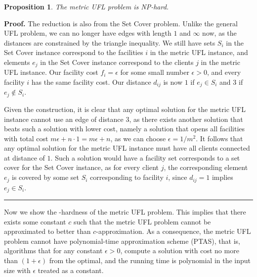 \documentclass[oneside,final]{ucr}
\newtheorem{proposition}[theorem]{Proposition}
\newenvironment{proof}[1][Proof]{\textbf{#1.} }{\ \rule{0.5em}{0.5em}}
\begin{document}
\begin{proposition} \label{prop:metricNP}
  The metric UFL problem is NP-hard.
\end{proposition}
\begin{proof}
  The reduction is also from the Set Cover problem. Unlike
  the general UFL problem, we can no longer have edges with
  length $1$ and $\infty$ now, as the distances are
  constrained by the triangle inequality. We still have sets
  $S_i$ in the Set Cover instance correspond to the
  facilities $i$ in the metric UFL instance, and elements
  $e_j$ in the Set Cover instance correspond to the clients
  $j$ in the metric UFL instance. Our facility cost $f_i =
  \epsilon$ for some small number $\epsilon > 0$, and every
  facility $i$ has the same facility cost. Our distance
  $d_{ij}$ is now $1$ if $e_j \in S_i$ and $3$ if $e_j
  \notin S_i$.

  Given the construction, it is clear that any optimal
  solution for the metric UFL instance cannot use an edge of
  distance $3$, as there exists another solution that beats
  such a solution with lower cost, namely a solution that
  opens all facilities with total cost $m\epsilon + n\cdot 1
  = m\epsilon + n$, as we can choose $\epsilon = 1/m^2$. It
  follows that any optimal solution for the metric UFL
  instance must have all clients connected at distance of
  $1$. Such a solution would have a facility set corresponds
  to a set cover for the Set Cover instance, as for every
  client $j$, the corresponding element $e_j$ is covered by
  some set $S_i$ corresponding to facility $i$, since
  $d_{ij} = 1$ implies $e_j \in S_i$.
\end{proof}

Now we show the {\MaxSNP}-hardness of the metric UFL
problem. This implies that there exists some constant $c$
such that the metric UFL problem cannot be approximated to
better than $c$-approximation. As a consequence, the metric
UFL problem cannot have polynomial-time approximation scheme
(PTAS), that is, algorithms that for any constant $\epsilon
> 0$, compute a solution with cost no more than
$(1+\epsilon)$ from the optimal, and the running time is
polynomial in the input size with $\epsilon$ treated as a
constant.
\end{document}
